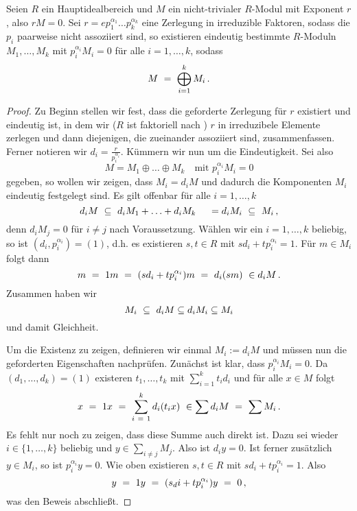\begin{satz}
  \label{satz:zerlegungssatz_moduln}
  Seien $R$ ein Hauptidealbereich und 
  $M$ ein nicht-trivialer $R$-Modul mit Exponent $r$, also $rM = 0$.
  Sei $r = e p_1^{\alpha_1}\ldots p_k^{\alpha_k}$ eine Zerlegung in irreduzible
  Faktoren, sodass die $p_i$ paarweise nicht assoziiert sind, 
  so existieren eindeutig bestimmte $R$-Moduln 
  $M_1,\ldots,M_k$ mit $p_i^{\alpha_i}M_i = 0$ für alle $i=1,\ldots,k$, sodass
  \[ M \ =\  \bigoplus_{i=1}^k M_i\,.\]
\end{satz}
\begin{proof}
  Zu Beginn stellen wir fest, dass die geforderte Zerlegung für $r$ existiert
  und eindeutig ist, in dem wir ($R$ ist faktoriell nach 
  ) $r$ in irreduzibele
  Elemente zerlegen und dann diejenigen, die zueinander assoziiert sind,
  zusammenfassen. Ferner notieren wir $d_i = \frac{r}{p_i^{\alpha_i}}$.
  Kümmern wir nun um die Eindeutigkeit. Sei also 
  \[ M = M_1 \oplus \ldots \oplus M_k \quad\text{mit } p_i^{\alpha_i} M_i = 0\]
  gegeben, so wollen wir zeigen, dass $M_i = d_i M$ und dadurch die Komponenten
  $M_i$ eindeutig festgelegt sind. Es gilt offenbar für alle $i=1,\ldots,k$
  \[ d_i M \ \subseteq\  d_i M_1 + \ldots + d_i M_k \ \ \ \ = d_i M_i 
    \ \subseteq\  M_i\,,\]
  denn $d_i M_j = 0$ für $i\neq j$ nach Voraussetzung. 
  Wählen wir ein $i = 1,\ldots,k$ beliebig, so ist 
  $(d_i, p_i^{\alpha_i}) = (1)$, d.h. es existieren $s,t \in R$ mit
  $sd_i + t p_i^{\alpha_i} = 1$. Für $m\in M_i$ folgt dann
  \[ m \speq= 1m \speq= (sd_i + tp_i^{\alpha_i})m \speq= d_i (sm)\ 
    \in d_i M\,. \]
  Zusammen haben wir 
  \[ M_i \ \subseteq\  d_iM \subseteq d_iM_i \subseteq M_i\]
  und damit Gleichheit.

  Um die Existenz zu zeigen, definieren wir einmal $M_i := d_iM$ und müssen nun
  die geforderten Eigenschaften nachprüfen. Zunächst ist klar, dass
  $p_i^{\alpha_i}M_i = 0$. Da $(d_1,\ldots,d_k) = (1)$ existeren 
  $t_1,\ldots,t_k$ mit $\sum_{i=1}^kt_id_i$ und für alle $x \in M$ folgt
  \[ x \ =\  1x \ =\  \sum_{i\ =\ 1}^k d_i(t_ix) 
    \ \in \sum d_iM \ =\  \sum M_i\,.\]
  Es fehlt nur noch zu zeigen, dass diese Summe auch direkt ist. 
  Dazu sei wieder $i\in\{1,\ldots,k\}$ beliebig und 
  $y \in \sum_{i\neq j} M_j$. Also ist $d_iy = 0$. Ist ferner zusätzlich
  $y \in M_i$, so ist $p_i^{\alpha_i}y = 0$. Wie oben existieren $s,t \in R$
  mit $sd_i + tp_i^{\alpha_i} = 1$. Also
  \[ y \ =\  1y \ =\  (s_di + tp_i^{\alpha_i})y \ =\  0\,,\]
  was den Beweis abschließt.
\end{proof}




